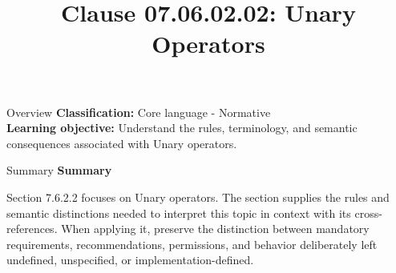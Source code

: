 \documentclass[10pt,letterpaper]{article}
\title{Clause 07.06.02.02: Unary Operators}
\author{}
\date{}
\begin{document}
\maketitle
\begin{CornellOverviewBox}{Overview}
\textbf{Classification:} Core language - Normative\\[2pt]
\textbf{Learning objective:} Understand the rules, terminology, and semantic consequences associated with Unary operators.
\end{CornellOverviewBox}\begin{CornellSummaryBox}{Summary}
{\sffamily\bfseries\color{Accent} Summary}\par\vspace{3pt}Section 7.6.2.2 focuses on Unary operators. The section supplies the rules and semantic distinctions needed to interpret this topic in context with its cross-references. When applying it, preserve the distinction between mandatory requirements, recommendations, permissions, and behavior deliberately left undefined, unspecified, or implementation-defined.
\end{CornellSummaryBox}
\end{document}
